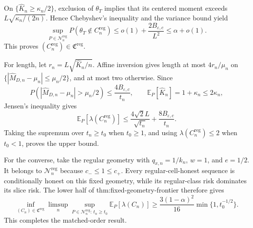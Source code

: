 On \(\{\widehat K_n\ge\kappa_n/2\}\), exclusion of \(\theta_T\) implies that its centered moment exceeds \(L\sqrt{\kappa_n/(2n)}\).  Hence Chebyshev's inequality and the variance bound yield
\[
 \sup_{P\in\mathcal N_n^{\mathrm{reg}}}P(\theta_T\notin C_n^{\mathrm{reg}})
 \le o(1)+\frac{2B_{\varepsilon,c}}{L^2}
 \le\alpha+o(1).
\]
This proves \((C_n^{\mathrm{reg}})\in\mathfrak C^{\mathrm{reg}}\).

For length, let \(r_n=L\sqrt{\widehat K_n/n}\).  Affine inversion gives length at most \(4r_n/\mu_n\) on \(\{|\widehat M_{D,n}-\mu_n|\le\mu_n/2\}\), and at most two otherwise.  Since
\[
 P(|\widehat M_{D,n}-\mu_n|>\mu_n/2)
 \le\frac{4B_{\varepsilon,c}}{t_n},
 \qquad
 \mathbb E_P[\widehat K_n]=1+\kappa_n\le2\kappa_n,
\]
Jensen's inequality gives
\[
 \mathbb E_P[\lambda(C_n^{\mathrm{reg}})]
 \le\frac{4\sqrt2L}{\sqrt{t_n}}+
 \frac{8B_{\varepsilon,c}}{t_n}.
\]
Taking the supremum over \(t_n\ge t_0\) when \(t_0\ge1\), and using \(\lambda(C_n^{\mathrm{reg}})\le2\) when \(t_0<1\), proves the upper bound.

For the converse, take the regular geometry with \(q_{x,n}=1/k_n\), \(w=1\), and \(e=1/2\).  It belongs to \(\mathcal N_n^{\mathrm{reg}}\) because \(c_-\le1\le c_+\).  Every regular-cell-honest sequence is conditionally honest on this fixed geometry, while its regular-class risk dominates its slice risk.  The lower half of thm:fixed-geometry-frontier therefore gives
\[
 \inf_{(C_n)\in\mathfrak C^{\mathrm{reg}}}
 \limsup_n\sup_{P\in\mathcal N_n^{\mathrm{reg}}:\,t_n\ge t_0}
 \mathbb E_P[\lambda(C_n)]
 \ge\frac{3(1-\alpha)^2}{16}\min\{1,t_0^{-1/2}\}.
\]
This completes the matched-order result.